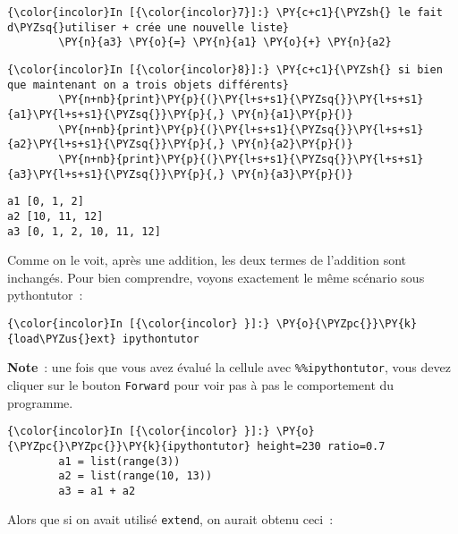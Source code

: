     \begin{Verbatim}[commandchars=\\\{\}]
{\color{incolor}In [{\color{incolor}7}]:} \PY{c+c1}{\PYZsh{} le fait d\PYZsq{}utiliser + crée une nouvelle liste}
        \PY{n}{a3} \PY{o}{=} \PY{n}{a1} \PY{o}{+} \PY{n}{a2}
\end{Verbatim}


    \begin{Verbatim}[commandchars=\\\{\}]
{\color{incolor}In [{\color{incolor}8}]:} \PY{c+c1}{\PYZsh{} si bien que maintenant on a trois objets différents}
        \PY{n+nb}{print}\PY{p}{(}\PY{l+s+s1}{\PYZsq{}}\PY{l+s+s1}{a1}\PY{l+s+s1}{\PYZsq{}}\PY{p}{,} \PY{n}{a1}\PY{p}{)}
        \PY{n+nb}{print}\PY{p}{(}\PY{l+s+s1}{\PYZsq{}}\PY{l+s+s1}{a2}\PY{l+s+s1}{\PYZsq{}}\PY{p}{,} \PY{n}{a2}\PY{p}{)}
        \PY{n+nb}{print}\PY{p}{(}\PY{l+s+s1}{\PYZsq{}}\PY{l+s+s1}{a3}\PY{l+s+s1}{\PYZsq{}}\PY{p}{,} \PY{n}{a3}\PY{p}{)}
\end{Verbatim}


    \begin{Verbatim}[commandchars=\\\{\}]
a1 [0, 1, 2]
a2 [10, 11, 12]
a3 [0, 1, 2, 10, 11, 12]

    \end{Verbatim}

    Comme on le voit, après une addition, les deux termes de l'addition sont
inchangés. Pour bien comprendre, voyons exactement le même scénario sous
pythontutor~:

    \begin{Verbatim}[commandchars=\\\{\}]
{\color{incolor}In [{\color{incolor} }]:} \PY{o}{\PYZpc{}}\PY{k}{load\PYZus{}ext} ipythontutor
\end{Verbatim}


    \textbf{Note}~: une fois que vous avez évalué la cellule avec
\texttt{\%\%ipythontutor}, vous devez cliquer sur le bouton
\texttt{Forward} pour voir pas à pas le comportement du programme.

    \begin{Verbatim}[commandchars=\\\{\}]
{\color{incolor}In [{\color{incolor} }]:} \PY{o}{\PYZpc{}\PYZpc{}}\PY{k}{ipythontutor} height=230 ratio=0.7
        a1 = list(range(3))
        a2 = list(range(10, 13))
        a3 = a1 + a2
\end{Verbatim}


    Alors que si on avait utilisé \texttt{extend}, on aurait obtenu ceci~:

